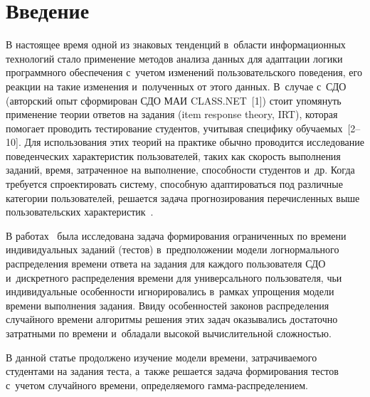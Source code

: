 
  



\thispagestyle{headings}

\begin{multicols}{2}

\label{st\stat}
     
     
\section{Введение}

    В настоящее время одной из знаковых тенденций в~области 
информационных технологий стало применение методов анализа данных для 
адаптации логики программного обеспечения с~учетом изменений 
пользовательского поведения, его реакции на такие изменения и~полученных от 
этого данных. В~случае с~СДО (авторский 
опыт сформирован СДО МАИ CLASS.NET~[1]) стоит упомянуть применение 
теории ответов на задания (item response theory, IRT), которая помогает 
проводить тестирование студентов, учитывая специфику обучаемых~[2--10]. 
Для использования этих теорий на практике обычно проводится исследование 
поведенческих характеристик пользователей, таких как скорость выполнения 
заданий, время, затраченное на выполнение, способности студентов и~др. Когда 
требуется спроектировать систему, способную адаптироваться под различные 
категории пользователей, решается задача прогнозирования перечисленных 
выше пользовательских характеристик~\cite{2-b, 3-b, 7-b, 8-b, 9-b}. 
    
    В работах~\cite{8-b, 9-b} была исследована задача формирования 
ограниченных по времени индивидуальных заданий (тестов) в~предположении 
модели логнормального распределения времени ответа на задания для каждого 
пользователя СДО и~дискретного распределения времени для универсального 
пользователя, чьи индивидуальные особенности игнорировались в~рамках 
упрощения модели времени выполнения задания. Ввиду особенностей законов 
распределения случайного времени алгоритмы решения этих задач 
оказывались достаточно затратными по времени и~обладали высокой 
вы\-чис\-ли\-тель\-ной сложностью.
    
    В данной статье продолжено изучение модели времени, затрачиваемого 
студентами на задания теста, а~также решается задача формирования тес\-тов 
с~учетом случайного времени, определяемого гам\-ма-рас\-пре\-де\-ле\-нием. 


\end{multicols}
